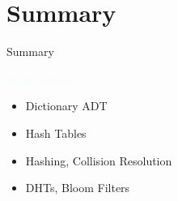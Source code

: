 \documentclass{beamer}
\newcommand{\tblue}[1]{{\Large {\textcolor{azure}{#1}}}}
\begin{document}
\section{Summary}

\begin{frame}{Summary}

\tblue{Major Concepts:}
\begin{itemize}
\item Dictionary ADT 
\item Hash Tables  
\item Hashing, Collision Resolution
\item DHTs, Bloom Filters
\end{itemize}
\end{frame}
\end{document}
